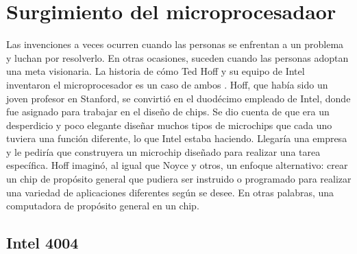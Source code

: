 \section{Surgimiento del microprocesadaor}
Las invenciones a veces ocurren cuando las personas se enfrentan a un problema y luchan por resolverlo. En otras ocasiones, suceden 
cuando las personas adoptan una meta visionaria. La historia de cómo Ted Hoff y su equipo de Intel inventaron el microprocesador es 
un caso de ambos . Hoff, que había sido un joven profesor en Stanford, se convirtió en el duodécimo empleado 
de Intel, donde fue asignado para trabajar en el diseño de chips. Se dio cuenta de que era un desperdicio y poco elegante diseñar 
muchos tipos de microchips que cada uno tuviera una función diferente, lo que Intel estaba haciendo. Llegaría una empresa y le pediría 
que construyera un microchip diseñado para realizar una tarea específica. Hoff imaginó, al igual que Noyce y otros, un enfoque 
alternativo: crear un chip de propósito general que pudiera ser instruido o programado para realizar una variedad de aplicaciones 
diferentes según se desee. En otras palabras, una computadora de propósito general en un chip.


\subsection{Intel 4004}


